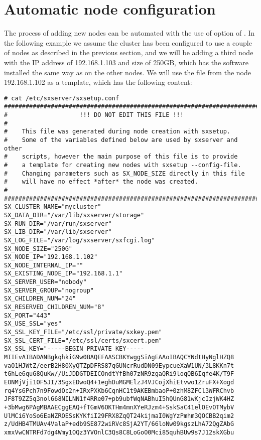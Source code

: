 \section{Automatic node configuration} \label{sec:configfile}
The process of adding new nodes can be automated with the use of
 option of . In the following example
we assume the cluster has been configured to use a couple of nodes as
described in the previous section, and we will be adding a third node
with the IP address of 192.168.1.103 and size of 250GB, which has the \SX
software installed the same way as on the other nodes. We will use the
 file from the node 192.168.1.102 as a template, which
has the following content:
\begin{lstlisting}
# cat /etc/sxserver/sxsetup.conf
#######################################################################
#                    !!! DO NOT EDIT THIS FILE !!!
#
#    This file was generated during node creation with sxsetup.
#    Some of the variables defined below are used by sxserver and other
#    scripts, however the main purpose of this file is to provide
#    a template for creating new nodes with sxsetup --config-file.
#    Changing parameters such as SX_NODE_SIZE directly in this file
#    will have no effect *after* the node was created.
#
#######################################################################
SX_CLUSTER_NAME="mycluster"
SX_DATA_DIR="/var/lib/sxserver/storage"
SX_RUN_DIR="/var/run/sxserver"
SX_LIB_DIR="/var/lib/sxserver"
SX_LOG_FILE="/var/log/sxserver/sxfcgi.log"
SX_NODE_SIZE="250G"
SX_NODE_IP="192.168.1.102"
SX_NODE_INTERNAL_IP=""
SX_EXISTING_NODE_IP="192.168.1.1"
SX_SERVER_USER="nobody"
SX_SERVER_GROUP="nogroup"
SX_CHILDREN_NUM="24"
SX_RESERVED_CHILDREN_NUM="8"
SX_PORT="443"
SX_USE_SSL="yes"
SX_SSL_KEY_FILE="/etc/ssl/private/sxkey.pem"
SX_SSL_CERT_FILE="/etc/ssl/certs/sxcert.pem"
SX_SSL_KEY="-----BEGIN PRIVATE KEY-----
MIIEvAIBADANBgkqhkiG9w0BAQEFAASCBKYwggSiAgEAAoIBAQCYNdtHyNglHZQ8
vaO1HJWtZ/eerB2H80XyQTZpDFRS87qGUNcrRudDN09EypcueXaW1UN/3L8KKn7t
tGhLe6quG8QuKw//UiJDDGTDEICOndtYfBh07zNR9zgaQRi9loqQB6Iqfe4K/T9F
EONMjVji1OF5JI/3SgxEDwoQ4+1eghDuMGMElzJ4VJCojXhiEtvwo1ZruFX+Xogd
rq4Ys6Pch7n9FowdOc2n+IRxPXKb6CqnHC1t9AKEBmbaoP+0zhM8ZFCl3WFRChvb
JF8T9ZZ5q3nol668NILNN1f4RRe07+pb9ubfWqNABhuI5hQUnG81wKjcIzjWK4HZ
+3bMwg6PAgMBAAECggEAQ+fTGmV6OKTHm4mnXYeRJzm4+SskSaC41elOEvOTMybV
UlMCi6YoSo6EaNZROESsKYKfiI29FRX8ZqQT24kijmaI0WgYzPmhm3QOCBB2qim2
z/UdHB4TMUAv4ValaP+edb9SE872wiRVc8SjA2YT/66loNw09kgszLhA72QgZAbG
xmxVwCNTRFd7dg4Wmy1OQz3YVOnlC3Qs8C8LoGoO0Mci85quhBUw9s7J12skXGbu

\end{lstlisting}
